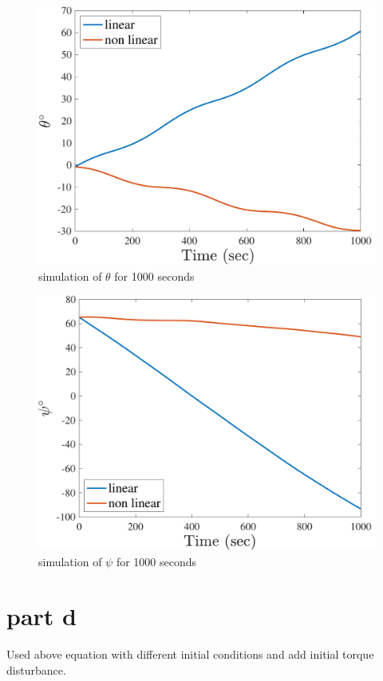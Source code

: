 \begin{figure}[H]
    \caption{simulation of $\theta$ for 1000 seconds}
    \centering
    \includegraphics[width=12cm]{../Figure/Q2/theta_1000}
\end{figure}

\begin{figure}[H]
    \caption{simulation of $\psi$ for 1000 seconds}
    \centering
    \includegraphics[width=12cm]{../Figure/Q2/psi_1000}
\end{figure}

\section{part d}

Used above equation with different initial conditions and add initial torque disturbance.

